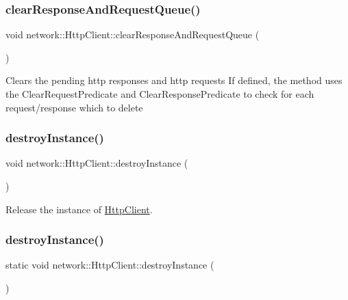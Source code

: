 \subsubsection{\texorpdfstring{clear\+Response\+And\+Request\+Queue()}{clearResponseAndRequestQueue()}}
{\footnotesize\ttfamily void network\+::\+Http\+Client\+::clear\+Response\+And\+Request\+Queue (\begin{DoxyParamCaption}{ }\end{DoxyParamCaption})}

Clears the pending http responses and http requests If defined, the method uses the Clear\+Request\+Predicate and Clear\+Response\+Predicate to check for each request/response which to delete \mbox{\label{classnetwork_1_1HttpClient_a468c50b7683b5b4a49f499ae052a0aa1}} 
\subsubsection{\texorpdfstring{destroy\+Instance()}{destroyInstance()}\hspace{0.1cm}{\footnotesize\ttfamily [1/2]}}
{\footnotesize\ttfamily void network\+::\+Http\+Client\+::destroy\+Instance (\begin{DoxyParamCaption}{ }\end{DoxyParamCaption})\hspace{0.3cm}{\ttfamily [static]}}

Release the instance of \hyperlink{classnetwork_1_1HttpClient}{Http\+Client}. \mbox{\label{classnetwork_1_1HttpClient_a9ee38b8135bf7a8161b857303a01c4ee}} 
\subsubsection{\texorpdfstring{destroy\+Instance()}{destroyInstance()}\hspace{0.1cm}{\footnotesize\ttfamily [2/2]}}
{\footnotesize\ttfamily static void network\+::\+Http\+Client\+::destroy\+Instance (\begin{DoxyParamCaption}{ }\end{DoxyParamCaption})\hspace{0.3cm}{\ttfamily [static]}}


